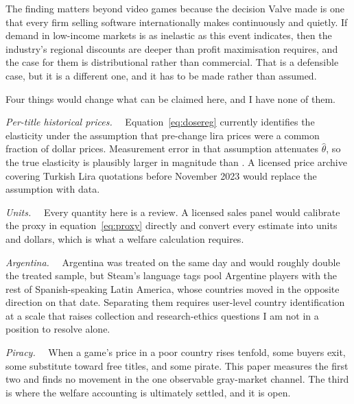 \documentclass[11pt]{article}
\newcommand{\heading}[1]{\vspace{3pt}\noindent\textit{#1}\ \ }
\begin{document}
The finding matters beyond video games because the decision Valve made is one that every firm
selling software internationally makes continuously and quietly. If demand in low-income markets is
as inelastic as this event indicates, then the industry's regional discounts are deeper than profit
maximisation requires, and the case for them is distributional rather than commercial. That is a
defensible case, but it is a different one, and it has to be made rather than assumed.

Four things would change what can be claimed here, and I have none of them.

\heading{Per-title historical prices.} Equation~\eqref{eq:dosereg} currently identifies the
elasticity under the assumption that pre-change lira prices were a common fraction of dollar prices.
Measurement error in that assumption attenuates $\hat\theta$, so the true elasticity is plausibly
larger in magnitude than \bDose. A licensed price archive covering Turkish Lira quotations before
November 2023 would replace the assumption with data.

\heading{Units.} Every quantity here is a review. A licensed sales panel would calibrate the proxy
in equation~\eqref{eq:proxy} directly and convert every estimate into units and dollars, which is
what a welfare calculation requires.

\heading{Argentina.} Argentina was treated on the same day and would roughly double the treated
sample, but Steam's language tags pool Argentine players with the rest of Spanish-speaking Latin
America, whose countries moved in the opposite direction on that date. Separating them requires
user-level country identification at a scale that raises collection and research-ethics questions I
am not in a position to resolve alone.

\heading{Piracy.} When a game's price in a poor country rises tenfold, some buyers exit, some
substitute toward free titles, and some pirate. This paper measures the first two and finds no
movement in the one observable gray-market channel. The third is where the welfare accounting is
ultimately settled, and it is open.

\newpage
\appendix
\renewcommand{\thesection}{Appendix \Alph{section}}
\titleformat{\section}{\normalfont\large\bfseries}{\thesection.}{0.6em}{}
\setcounter{table}{0}
\renewcommand{\thetable}{A\arabic{table}}
\setcounter{figure}{0}
\renewcommand{\thefigure}{A\arabic{figure}}
\end{document}
